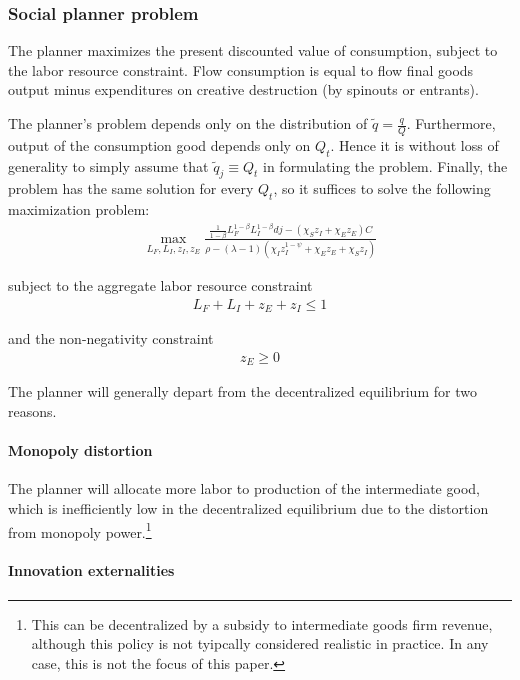 \documentclass[11pt,english]{article}
\theoremstyle{remark}
\begin{document}
\subsubsection{Social planner problem}

The planner maximizes the present discounted value of consumption, subject to the labor resource constraint. Flow consumption is equal to flow final goods output minus expenditures on creative destruction (by spinouts or entrants).  

The planner's problem depends only on the distribution of $\tilde{q} = \frac{q}{Q}$. Furthermore, output of the consumption good depends only on $Q_t$. Hence it is without loss of generality to simply assume that $\tilde{q}_j \equiv Q_t$ in formulating the problem. Finally, the problem has the same solution for every $Q_t$, so it suffices to solve the following maximization problem:
\begin{align*}
\max_{L_F,L_I,z_I,z_E} \frac{\frac{1}{1-\beta} L_F^{1-\beta} L_I^{1-\beta} dj - (\chi_S z_I + \chi_E z_E) C}{\rho - (\lambda-1)(\chi_I z_I^{1-\psi} + \chi_E z_E + \chi_S z_I)} 
\end{align*}

subject to the aggregate labor resource constraint
\begin{align*}
L_F + L_I + z_E + z_I \le 1
\end{align*}

and the non-negativity constraint
\begin{align*}
z_E \ge 0
\end{align*}

The planner will generally depart from the decentralized equilibrium for two reasons.

\paragraph{Monopoly distortion}
The planner will allocate more labor to production of the intermediate good, which is inefficiently low in the decentralized equilibrium due to the distortion from monopoly power.\footnote{This can be decentralized by a subsidy to intermediate goods firm revenue, although this policy is not tyipcally considered realistic in practice. In any case, this is not the focus of this paper.} 

\paragraph{Innovation externalities}
\end{document}
